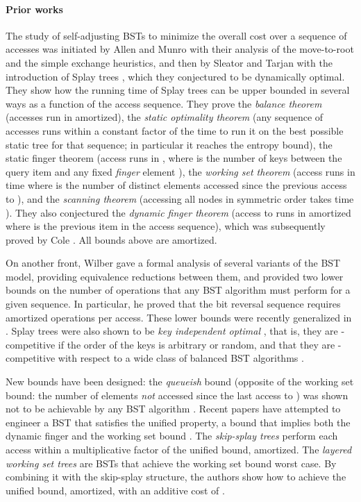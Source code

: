 \documentclass[11pt]{article}
\begin{document}
\paragraph{Prior works}
The study of self-adjusting BSTs to minimize the overall cost over a
sequence of accesses was initiated by Allen and Munro \cite{allen}
with their analysis of the move-to-root and the simple exchange
heuristics, and then by Sleator and Tarjan with the introduction of
Splay trees \cite{splay}, which they conjectured to be dynamically
optimal.  They show how the running time of Splay trees can be upper
bounded in several ways as a function of the access sequence. They
prove the \emph{balance theorem} (accesses run in 
amortized), the \emph{static optimality theorem} (any sequence of
accesses runs within a constant factor of the time to run it on the
best possible static tree for that sequence; in particular it reaches
the entropy bound), the static finger theorem (access  runs
in , where  is the number of keys between the
query item  and any fixed \emph{finger} element ), the
\emph{working set theorem} (access  runs in time 
where  is the number of distinct elements accessed since the
previous access to ), and the \emph{scanning theorem} (accessing
all nodes in symmetric order takes time ). They also conjectured
the \emph{dynamic finger theorem} (access to  runs in amortized
 where  is the previous item in the access
sequence), which was subsequently proved by Cole \cite{cole,cole2}.
All bounds above are amortized.

On another front, Wilber \cite{wilber89} gave a formal analysis of
several variants of the BST model, providing equivalence reductions
between them, and provided two lower bounds on the number of
operations that any BST algorithm must perform for a given sequence.
In particular, he proved that the bit reversal sequence requires
 amortized operations per access. 
These lower bounds were recently generalized
in \cite{rectcover,BST_SODA2009}. 
Splay trees were also shown to be \emph{key independent optimal}
\cite{keyindependent}, that is, they are -competitive if the order of the
keys is arbitrary or random, and that they are -competitive with
respect to a wide class of balanced BST algorithms \cite{Georgakopoulos200464}.

New bounds have been designed: the \emph{queueish} bound (opposite of the
working set bound: the number of elements \emph{not} accessed since
the last access to ) was shown not to be achievable by any BST algorithm
\cite{queaps}. Recent papers have attempted to engineer a BST that satisfies the
unified property, a bound that implies both the dynamic finger and the working set
bound \cite{unified,unified2}. The \emph{skip-splay trees} \cite{skipsplay}
perform each access within a multiplicative factor  of
the unified bound, amortized. The \emph{layered working set trees} \cite{workingsettrees}
are BSTs that achieve the working set bound worst case. By combining
it with the skip-splay structure, the authors show how to achieve the
unified bound, amortized, with an additive cost of . 
\end{document}
